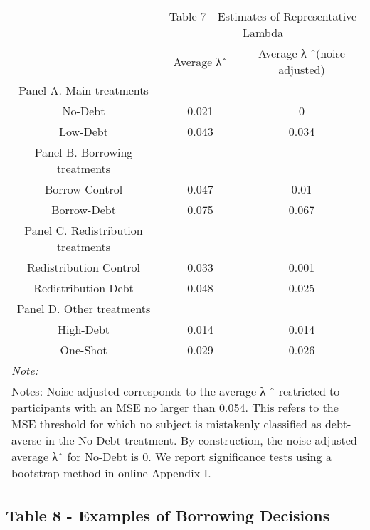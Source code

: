 \documentclass[
]{article}
\begin{document}
\begin{longtable}[t]{ccc}
\toprule
\multicolumn{1}{c}{ } & \multicolumn{2}{c}{Table 7 - Estimates of Representative Lambda} \\
\cmidrule(l{3pt}r{3pt}){2-3}
 & Average λˆ & Average λ ˆ(noise adjusted)\\
\midrule
Panel A. Main treatments &  & \\
No-Debt & 0.021 & 0\\
Low-Debt & 0.043 & 0.034\\
Panel B. Borrowing treatments &  & \\
Borrow-Control & 0.047 & 0.01\\
\addlinespace
Borrow-Debt & 0.075 & 0.067\\
Panel C. Redistribution treatments &  & \\
Redistribution Control & 0.033 & 0.001\\
Redistribution Debt & 0.048 & 0.025\\
Panel D. Other treatments &  & \\
\addlinespace
High-Debt & 0.014 & 0.014\\
One-Shot & 0.029 & 0.026\\
\bottomrule
\multicolumn{3}{l}{\rule{0pt}{1em}\textit{Note: }}\\
\multicolumn{3}{l}{\rule{0pt}{1em}Notes: Noise adjusted corresponds to the average λ ˆ restricted to participants with an MSE no larger than 0.054. This refers to the MSE threshold for which no subject is mistakenly classified as debt-averse in the No-Debt treatment. By construction, the noise-adjusted average λˆ for No-Debt is 0. We report significance tests using a bootstrap method in online Appendix I.}\\
\end{longtable}

\subsection{Table 8 - Examples of Borrowing
Decisions}\label{table-8---examples-of-borrowing-decisions}
\end{document}
